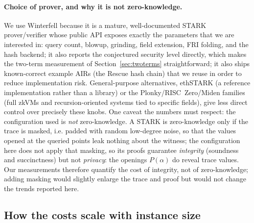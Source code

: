\documentclass[11pt]{article}
\begin{document}
\paragraph{Choice of prover, and why it is not zero-knowledge.} We use Winterfell because it is a
mature, well-documented STARK prover/verifier whose public API exposes exactly the parameters
that we are interested in: query count, blowup, grinding, field extension, FRI folding, and the hash backend; it also 
reports the conjectured security level directly, which makes the two-term measurement of
Section~\ref{sec:twoterms} straightforward; it also ships known-correct example AIRs (the Rescue hash
chain) that we reuse in order to reduce implementation risk. General-purpose alternatives, ethSTARK
(a reference implementation rather than a library) or the Plonky/RISC~Zero/Miden families
(full zkVMs and recursion-oriented systems tied to specific fields), give less direct control over
precisely these knobs. One caveat the numbers must respect: the configuration used is \emph{not}
zero-knowledge. A STARK is zero-knowledge only if the trace is masked, i.e. padded with random low-degree
noise, so that the values opened at the queried points leak nothing about the witness; the
configuration here does not apply that masking, so its proofs guarantee \emph{integrity} (soundness and
succinctness) but not \emph{privacy}: the openings $P(\alpha)$ do reveal trace values. Our measurements
therefore quantify the cost of integrity, not of zero-knowledge; adding masking would slightly enlarge
the trace and proof but would not change the trends reported here.

\subsection{How the costs scale with instance size}
\label{sec:scaling}
\end{document}
